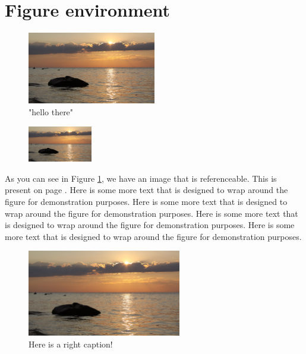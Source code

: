 \documentclass[12pt]{report}
\begin{document}
\section{Figure environment}
\begin{figure}[h]
    \centering %
    \includegraphics[width = 0.5\textwidth]{demo}
    \caption{"hello there"} %
    \label{fig:figure1} %
\end{figure}

\begin{figure} %
    \centering
    \includegraphics[width = 0.25\textwidth]{demo} %
\end{figure}

As you can see in Figure \ref{fig:figure1}, we have an image that is referenceable. This is present on page \pageref{fig:figure1}.  Here is some more text that is designed to wrap around the figure for demonstration purposes. Here is some more text that is designed to wrap around the figure for demonstration purposes. Here is some more text that is designed to wrap around the figure for demonstration purposes. Here is some more text that is designed to wrap around the figure for demonstration purposes. 

\begin{figure} %
\caption{Here is a right caption!}
\includegraphics[width=0.6\textwidth]{demo}
\end{figure}
\end{document}
